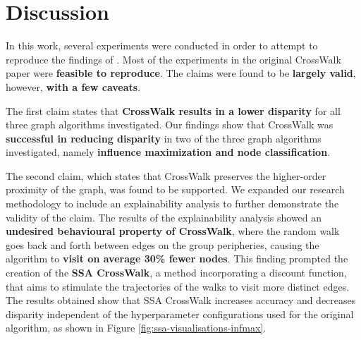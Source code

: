 
\newpage
\section{Discussion}
In this work, several experiments were conducted in order to attempt to reproduce the findings of  \cite{crosswalk}. Most of the experiments in the original CrossWalk paper were \textbf{feasible to reproduce}. The claims were found to be \textbf{largely valid}, however, \textbf{with a few caveats}. \vspace{2mm}

The first claim states that \textbf{CrossWalk results in a lower disparity} for all three graph algorithms investigated. Our findings show that CrossWalk was \textbf{successful in reducing disparity} in two of the three graph algorithms investigated, namely \textbf{influence maximization and node classification}.  \vspace{1mm}

The second claim, which states that CrossWalk preserves the higher-order proximity of the graph, was found to be supported. We expanded our research methodology to include an explainability analysis to further demonstrate the validity of the claim. The results of the explainability analysis showed an \textbf{undesired behavioural property of CrossWalk}, where the random walk goes back and forth between edges on the group peripheries, causing the algorithm to \textbf{visit on average 30\% fewer nodes}. This finding prompted the creation of the \textbf{SSA CrossWalk}, a method incorporating a discount function, that aims to stimulate the trajectories of the walks to visit more distinct edges. The results obtained show that SSA CrossWalk increases accuracy and decreases disparity independent of the hyperparameter configurations used for the original algorithm, as shown in Figure \ref{fig:ssa-visualisations-infmax}. \vspace{2mm}


